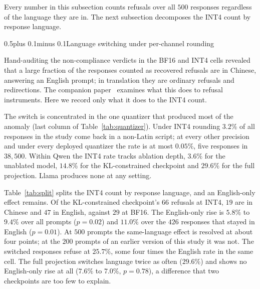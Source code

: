 \documentclass[conference,compsoc,letterpaper]{IEEEtran}
\makeatletter
\def\subsection{\@startsection{subsection}{2}{\z@}{1\baselineskip plus 0.25\baselineskip minus 0.25\baselineskip}%
{0.5\baselineskip plus 0.1\baselineskip minus 0.1\baselineskip}{\normalfont\sublargesize\bfseries}}%
\makeatother
\begin{document}
Every number in this subsection counts refusals over all $500$ responses regardless of the language they are in. The next subsection decomposes the INT4 count by response language.

\subsection{Language switching under per-channel \texorpdfstring{\mbox{rounding}}{rounding}}
\label{sec:language}

\begin{table}[t]
\caption{The INT4 rounding count split by the language of the response, for both
abliterated Qwen checkpoints. $p$ is an exact McNemar test against the BF16 row,
except the last English-only row, whose denominator differs and which is
therefore Fisher's exact.}
\label{tab:split}
\centering\scriptsize

\end{table}

Hand-auditing the non-compliance verdicts in the BF16 and INT4 cells revealed that a large fraction of the responses counted as recovered refusals are in Chinese, answering an English prompt; in translation they are ordinary refusals and redirections. The companion paper~\cite{kim2026measuring} examines what this does to refusal instruments. Here we record only what it does to the INT4 count.

The switch is concentrated in the one quantizer that produced most of the anomaly (last column of Table~\ref{tab:quantizer}). Under INT4 rounding $3.2\%$ of all responses in the study come back in a non-Latin script; at every other precision and under every deployed quantizer the rate is at most $0.05\%$, five responses in $38{,}500$. Within Qwen the INT4 rate tracks ablation depth, $3.6\%$ for the unablated model, $14.8\%$ for the KL-constrained checkpoint and $29.6\%$ for the full projection. Llama produces none at any setting.

Table~\ref{tab:split} splits the INT4 count by response language, and an English-only effect remains. Of the KL-constrained checkpoint's $66$ refusals at INT4, $19$ are in Chinese and $47$ in English, against $29$ at BF16. The English-only rise is $5.8\%$ to $9.4\%$ over all prompts ($p=0.02$) and $11.0\%$ over the $426$ responses that stayed in English ($p=0.01$). At $500$ prompts the same-language effect is resolved at about four points; at the $200$ prompts of an earlier version of this study it was not. The switched responses refuse at $25.7\%$, some four times the English rate in the same cell. The full projection switches language twice as often ($29.6\%$) and shows no English-only rise at all ($7.6\%$ to $7.0\%$, $p=0.78$), a difference that two checkpoints are too few to explain.
\end{document}
